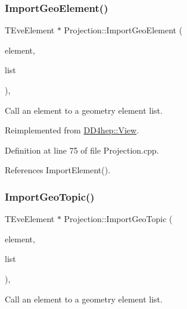 \subsubsection{\texorpdfstring{Import\+Geo\+Element()}{ImportGeoElement()}}
{\footnotesize\ttfamily T\+Eve\+Element $\ast$ Projection\+::\+Import\+Geo\+Element (\begin{DoxyParamCaption}\item[{T\+Eve\+Element $\ast$}]{element,  }\item[{\hyperlink{class_t_eve_element_list}{T\+Eve\+Element\+List} $\ast$}]{list }\end{DoxyParamCaption})\hspace{0.3cm}{\ttfamily [protected]}, {\ttfamily [virtual]}}



Call an element to a geometry element list. 



Reimplemented from \hyperlink{class_d_d4hep_1_1_view_adc25ba7ece97c2f7c69f8fa6e0c13088}{D\+D4hep\+::\+View}.



Definition at line 75 of file Projection.\+cpp.



References Import\+Element().

\hypertarget{class_d_d4hep_1_1_projection_a97415addc63b3253bbccc3bcd0414c26}{}\label{class_d_d4hep_1_1_projection_a97415addc63b3253bbccc3bcd0414c26} 
\subsubsection{\texorpdfstring{Import\+Geo\+Topic()}{ImportGeoTopic()}}
{\footnotesize\ttfamily T\+Eve\+Element $\ast$ Projection\+::\+Import\+Geo\+Topic (\begin{DoxyParamCaption}\item[{T\+Eve\+Element $\ast$}]{element,  }\item[{\hyperlink{class_t_eve_element_list}{T\+Eve\+Element\+List} $\ast$}]{list }\end{DoxyParamCaption})\hspace{0.3cm}{\ttfamily [protected]}, {\ttfamily [virtual]}}



Call an element to a geometry element list. 



